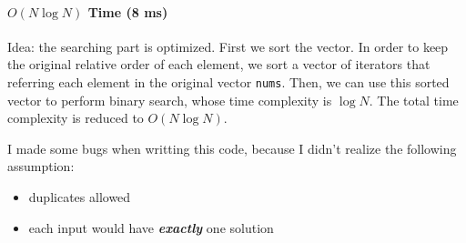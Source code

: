 \documentclass[11pt]{article}
\begin{document}
\paragraph{\(O(N\log{N})\) Time (8 ms)}
\label{sec:orgb2621b7}
Idea: the searching part is optimized. First we sort the vector. In order to keep the original relative order of each element, we sort a vector of iterators that referring each element in the original vector \texttt{nums}. Then, we can use this sorted vector to perform binary search, whose time complexity is \(\log{N}\). The total time complexity is reduced to \(O(N\log{N})\).

I made some bugs when writting this code, because I didn't realize the following assumption:
\begin{itemize}
\item duplicates allowed
\item each input would have \textbf{\emph{exactly}} one solution
\end{itemize}
\end{document}
